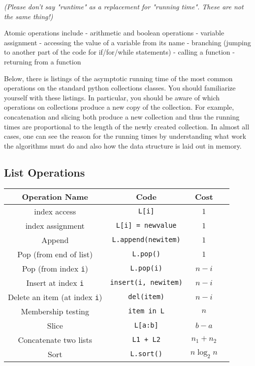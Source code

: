 \emph{(Please don't say "runtime" as a replacement for "running time".  These are not the same thing!)}


Atomic operations include
 - arithmetic and boolean operations
 - variable assignment
 - accessing the value of a variable from its name
 - branching (jumping to another part of the code for if/for/while statements)
 - calling a function
 - returning from a function


Below, there is listings of the asymptotic running time of the most common operations on the standard python collections classes.
You should familiarize yourself with these listings.
In particular, you should be aware of which operations on collections produce a new copy of the collection.
For example, concatenation and slicing both produce a new collection and thus the running times are proportional to the length of the newly created collection.
In almost all cases, one can see the reason for the running times by understanding what work the algorithms must do and also how the data structure is laid out in memory.

\subsection{List Operations}

\begin{tabular}{c c c c}

\hline


Operation Name & 
Code & 
Cost & 
\\
\hline



index access &
\texttt{L[i]} &
$1$ &
\\

index assignment &
\texttt{L[i] = newvalue} &
$1$ &
\\

Append &
\texttt{L.append(newitem)} &
$1$ &
\\

Pop (from end of list) &
\texttt{L.pop()} &
$1$ &
\\

Pop (from index \texttt{i}) &
\texttt{L.pop(i)} &
$n - i$ &
\\

Insert at index \texttt{i} &
\texttt{insert(i, newitem)} &
$n-i$ &
\\

Delete an item (at index \texttt{i}) &
\texttt{del(item)} &
$n - i$ &
\\

Membership testing &
\texttt{item in L} &
$n$ &
\\

Slice &
\texttt{L[a:b]} &
$b-a$ &
\\

Concatenate two lists &
\texttt{L1 + L2} &
$n_1 + n_2$ &
\\

Sort &
\texttt{L.sort()} &
$n \log_2 n$ &
\\
\hline
\end{tabular}


